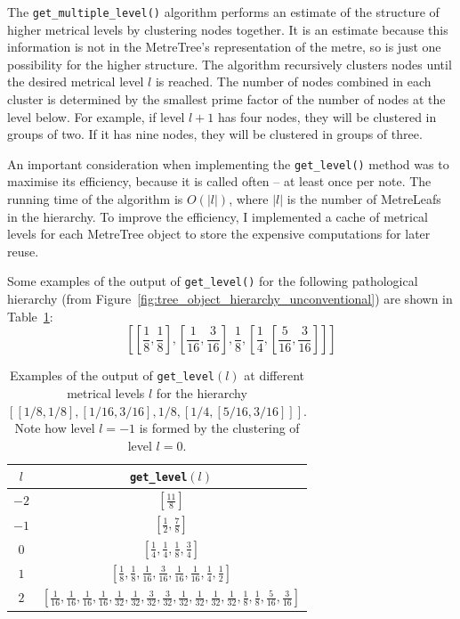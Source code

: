 \documentclass[12pt,twoside,openright]{report}
\begin{document}
The \verb'get_multiple_level()' algorithm performs an estimate of the structure of
higher metrical levels by clustering nodes together. It is an estimate because this information is not in the
MetreTree's representation of the metre, so is just one possibility for the higher structure. The algorithm recursively clusters nodes until
the desired metrical level $l$ is reached. The number of nodes combined in each cluster is
determined by the smallest prime factor of the number of nodes at the level below. For
example, if level $l+1$ has four nodes, they will be clustered in groups of two. If it
has nine nodes, they will be clustered in groups of three.

An important consideration when implementing the \verb'get_level()' method was to
maximise its efficiency, because it is called often -- at least once per note. The
running time of the algorithm is $O(\left\lvert l\right\rvert)$, where $\left\lvert l\right\rvert$ is the number of MetreLeafs in the
hierarchy. To improve the efficiency, I implemented a cache of metrical levels for each
MetreTree object to store the expensive computations for later reuse.

Some examples of the output of \verb'get_level()' for the following pathological hierarchy (from Figure~\ref{fig:tree_object_hierarchy_unconventional}) are shown in Table~\ref{table:get_level}:
\[
    \left[
        \left[\frac{1}{8},\frac{1}{8}\right],
        \left[\frac{1}{16},\frac{3}{16}\right],
        \frac{1}{8},
        \left[\frac{1}{4},\left[\frac{5}{16},\frac{3}{16}\right]\right]
    \right]
\]

\begin{table}[ht]
    \centering
    \renewcommand{\arraystretch}{2.0}
    \begin{tabular}{|c|c|}
        \hline
        $l$     & \verb'get_level'$(l)$ \\
        \hline
        $-2$    & $\displaystyle \left[ \frac{11}{8} \right]$ \\
        $-1$    & $\displaystyle \left[ \frac{1}{2},\frac{7}{8} \right]$ \\
        $0$     & $\displaystyle \left[ \frac{1}{4},\frac{1}{4},\frac{1}{8},\frac{3}{4} \right]$ \\
        $1$     & $\displaystyle \left[ \frac{1}{8},\frac{1}{8},\frac{1}{16},\frac{3}{16},\frac{1}{16},\frac{1}{16},\frac{1}{4},\frac{1}{2} \right]$ \\
        $2$     & $\displaystyle \left[ \frac{1}{16},\frac{1}{16},\frac{1}{16},\frac{1}{16},\frac{1}{32},\frac{1}{32},\frac{3}{32},\frac{3}{32},\frac{1}{32},\frac{1}{32},\frac{1}{32},\frac{1}{32},\frac{1}{8},\frac{1}{8},\frac{5}{16},\frac{3}{16} \right]$ \\ [1ex]
        \hline
    \end{tabular}
    \renewcommand{\arraystretch}{1.0}
    \cprotect\caption{Examples of the output of \verb'get_level'$(l)$ at different metrical levels $l$ for the hierarchy $[[1/8,1/8],[1/16,3/16],1/8,[1/4,[5/16,3/16]]]$. Note how level $l=-1$ is formed by the clustering of level $l=0$.}
    \label{table:get_level}
\end{table}
\end{document}
